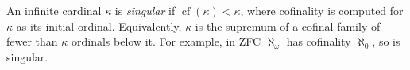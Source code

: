 
An infinite cardinal $\kappa$ is \emph{singular} if $\operatorname{cf}(\kappa)<\kappa$, where cofinality is computed for $\kappa$ as its initial ordinal. Equivalently, $\kappa$ is the supremum of a cofinal family of fewer than $\kappa$ ordinals below it. For example, in ZFC $\aleph_\omega$ has cofinality $\aleph_0$, so is singular.
